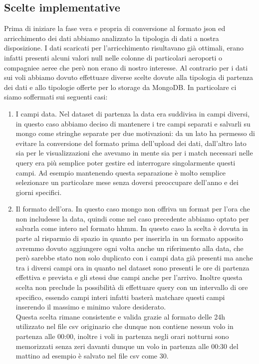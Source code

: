 \documentclass[12pt]{article}
\begin{document}
\subsection{Scelte implementative}
Prima di iniziare la fase vera e propria di conversione al formato json ed arricchimento dei dati abbiamo analizzato la tipologia di dati a nostra disposizione. I dati scaricati per l'arricchimento risultavano già ottimali, erano infatti presenti alcuni valori null nelle colonne di particolari aeroporti o compagniee aeree che però non erano di nostro interesse. Al contrario per i dati sui voli abbiamo dovuto effettuare diverse scelte dovute alla tipologia di partenza dei dati e allo tipologie offerte per lo storage da MongoDB. In particolare ci siamo soffermati sui seguenti casi:
\begin{enumerate}
    \item I campi data. Nel dataset di partenza la data era suddivisa in campi diversi, in questo caso abbiamo deciso di mantenere i tre campi separati e salvarli su mongo come stringhe separate per due motivazioni: da un lato ha permesso di evitare la conversione del formato prima dell'upload dei dati, dall'altro lato sia per le visualizzazioni che avevamo in mente sia per i match necessari nelle query era più semplice poter gestire ed interrogare singolarmente questi campi. Ad esempio mantenendo questa separazione è molto semplice selezionare un particolare mese senza doversi preoccupare dell'anno e dei giorni specifici.
    \item Il formato dell'ora. In questo caso mongo non offriva un format per l'ora che non includesse la data, quindi come nel caso precedente abbiamo optato per salvarla come intero nel formato hhmm. In questo caso la scelta è dovuta in parte al risparmio di spazio in quanto per inserirla in un formato apposito avremmo dovuto aggiungere ogni volta anche un riferimento alla data, che però sarebbe stato non solo duplicato con i campi data già presenti ma anche tra i diversi campi ora in quanto nel dataset sono presenti le ore di partenza effettiva e prevista e gli stessi due campi anche per l'arrivo. Inoltre questa scelta non preclude la possibilità di effettuare query con un intervallo di ore specifico, essendo campi interi infatti basterà matchare questi campi inserendo il massimo e minimo valore desiderato. \\
    Questa scelta rimane consistente e valida grazie al formato delle 24h utilizzato nel file csv originario che dunque non contiene nessun volo in partenza alle 00:00, inoltre i voli in partenza negli orari notturni sono memorizzati senza zeri davanti dunque un volo in partenza alle 00:30 del mattino ad esempio è salvato nel file csv come 30.

\end{enumerate}
\end{document}

